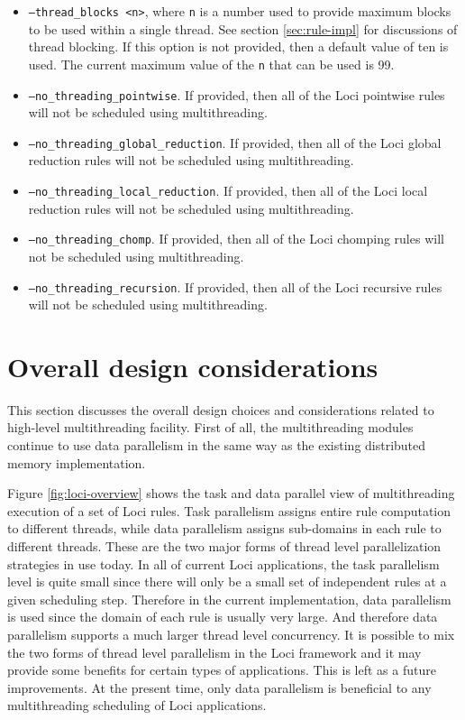 \documentclass{article}
\begin{document}
\begin{itemize}
  \item \texttt{--thread\_blocks <n>}, where \texttt{n} is a number used
    to provide maximum blocks to be used within a single thread.  See
    section \ref{sec:rule-impl} for discussions of thread blocking.  If
    this option is not provided, then a default value of ten is used.
    The current maximum value of the \texttt{n} that can be used is 99.
  \item \texttt{--no\_threading\_pointwise}.  If provided, then all of
    the Loci pointwise rules will not be scheduled using multithreading.
  \item \texttt{--no\_threading\_global\_reduction}.  If provided, then
    all of the Loci global reduction rules will not be scheduled using
    multithreading.
  \item \texttt{--no\_threading\_local\_reduction}.  If provided, then
    all of the Loci local reduction rules will not be scheduled using
    multithreading.
  \item \texttt{--no\_threading\_chomp}.  If provided, then all of the
    Loci chomping rules will not be scheduled using multithreading.
  \item \texttt{--no\_threading\_recursion}.  If provided, then all of
    the Loci recursive rules will not be scheduled using multithreading.
\end{itemize}

\section{Overall design considerations}
This section discusses the overall design choices and considerations
related to high-level multithreading facility.  First of all, the
multithreading modules continue to use data parallelism in the same way
as the existing distributed memory implementation.

Figure \ref{fig:loci-overview} shows the task and data parallel view of
multithreading execution of a set of Loci rules.  Task parallelism
assigns entire rule computation to different threads, while data
parallelism assigns sub-domains in each rule to different threads.
These are the two major forms of thread level parallelization strategies
in use today.  In all of current Loci applications, the task parallelism
level is quite small since there will only be a small set of independent
rules at a given scheduling step.  Therefore in the current
implementation, data parallelism is used since the domain of each rule
is usually very large.  And therefore data parallelism supports a much
larger thread level concurrency.  It is possible to mix the two forms of
thread level parallelism in the Loci framework and it may provide some
benefits for certain types of applications.  This is left as a future
improvements.  At the present time, only data parallelism is beneficial
to any multithreading scheduling of Loci applications.
\end{document}
